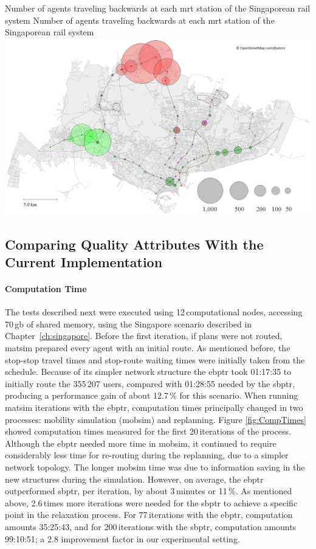 \createfigure
{Number of agents traveling backwards at each \protect\gls{mrt} station of the Singaporean rail system}
{Number of agents traveling backwards at each \protect\gls{mrt} station of the Singaporean rail system}
{\label{fig:Backwards}}
{\includegraphics[width=1.0\textwidth]{extending/figures/ebr/Backwards.png}}
{}

\subsection{Comparing Quality Attributes With the Current Implementation}

\paragraph{Computation Time}

The tests described next were executed using 12\,computational nodes, accessing 70\,\gls{gb} of shared memory, using the Singapore scenario described in Chapter~\ref{ch:singapore}. Before the first iteration, if plans were not routed, \gls{matsim} prepared every agent with an initial route. As mentioned before, the stop-stop travel times and stop-route waiting times were initially taken from the schedule. Because of its simpler network structure the \gls{ebptr} took 01:17:35 to initially route the 355\,207 users, compared with 01:28:55 needed by the \gls{sbptr}, producing a performance gain of about 12.7\,\% for this scenario. When running \gls{matsim} iterations with the \gls{ebptr}, computation times principally changed in two processes: mobility simulation (mobsim) and replanning. Figure \ref{fig:CompTimes} showed computation times measured for the first 20\,iterations of the process. Although the \gls{ebptr} needed more time in \gls{mobsim}, it continued to require considerably less time for re-routing during the replanning, due to a simpler network topology. The longer mobsim time was due to information saving in the new structures during the simulation. However, on average, the \gls{ebptr} outperformed \gls{sbptr}, per iteration, by about 3\,minutes or 11\,\%. As mentioned above, 2.6\,times more iterations were needed for the \gls{sbptr} to achieve a specific point in the relaxation process. For 77\,iterations with the \gls{ebptr}, computation amounts 35:25:43, and for 200\,iterations with the \gls{sbptr}, computation amounts 99:10:51; a 2.8 improvement factor in our experimental setting.

